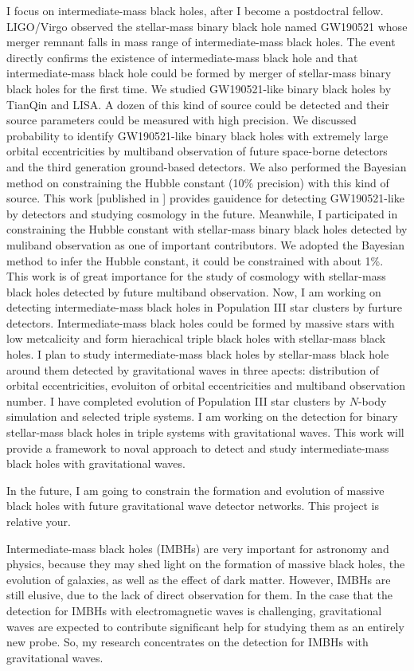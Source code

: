 \documentclass[12pt,a4paper,sans]{article}%
\begin{document}
I focus on intermediate-mass black holes, after I become a postdoctral fellow. LIGO/Virgo observed the stellar-mass binary black hole named
GW190521 whose merger remnant falls in mass range of intermediate-mass black holes. The event directly confirms the existence of
intermediate-mass black hole and that intermediate-mass black hole could be formed by merger of stellar-mass binary
black holes for the first time. We studied GW190521-like binary black holes by TianQin and LISA. A dozen of this kind of
source could be detected and their source parameters could be measured with high precision. We discussed probability to identify GW190521-like binary black holes with extremely large orbital eccentricities by
multiband observation of future space-borne detectors and the third generation ground-based detectors. We also performed the Bayesian method
on constraining the Hubble constant (10\% precision) with this kind of source. This work [published in ] provides
gauidence for detecting GW190521-like by detectors and studying cosmology in the future. Meanwhile, I participated in constraining the Hubble
constant with stellar-mass binary black holes detected by muliband observation as one of important contributors. We
adopted the Bayesian method to infer the Hubble constant, it could be constrained with about 1\%. This work is of great
importance for the study of cosmology with stellar-mass black holes detected by future multiband observation. Now, I am working on
detecting intermediate-mass black holes in Population III star clusters by furture detectors. Intermediate-mass black
holes could be formed by massive stars with low metcalicity and form hierachical triple black holes with stellar-mass
black holes. I plan to study intermediate-mass black holes by stellar-mass black hole around them detected by gravitational waves in three apects: distribution of orbital
eccentricities, evoluiton of orbital eccentricities and multiband observation number. I have completed evolution of
Population III star clusters by $N$-body simulation and selected triple systems. I am working on the detection for 
binary stellar-mass black holes in triple systems with gravitational waves. This work will provide a framework to noval
approach to detect and study intermediate-mass black holes with gravitational waves.

In the future, I am going to constrain the formation and evolution of massive black holes with future gravitational
wave detector networks. This project is relative your.   

Intermediate-mass black holes (IMBHs) are very important for astronomy and physics, because they may shed
light on the formation of massive black holes, the evolution of galaxies, as well as the effect of dark matter. However, IMBHs
are still elusive, due to the lack of direct observation for them. In the case that the detection for IMBHs with
electromagnetic waves is challenging, gravitational waves are expected to contribute significant help for studying them 
as an entirely new probe. So, my research concentrates on the detection for IMBHs with gravitational waves.
\end{document}

